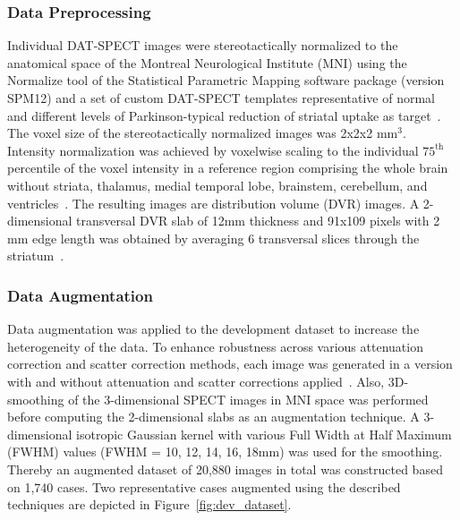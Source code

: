 \subsubsection{Data Preprocessing}
\label{subsubsec:img_preprocess_dev}



Individual DAT-SPECT images were stereotactically normalized to the anatomical space of the Montreal Neurological Institute (MNI) 
using the Normalize tool of the Statistical Parametric Mapping software package (version SPM12) and a set of custom DAT-SPECT templates 
representative of normal and different levels of Parkinson-typical reduction of striatal uptake as target~\citep{Apostolova2023-ec}.
The voxel size of the stereotactically normalized images was 2x2x2 mm$^{3}$. 
Intensity normalization was achieved by voxelwise scaling to the individual $75^{\text{th}}$ percentile of the voxel intensity in a reference region 
comprising the whole brain without striata, thalamus, medial temporal lobe, brainstem, cerebellum, and ventricles~\citep{Kupitz2014-ll}.
The resulting images are distribution volume (DVR) images. 
A 2-dimensional transversal DVR slab of 12mm thickness and 91x109 pixels with 2 mm edge length was obtained 
by averaging 6 transversal slices through the striatum~\citep{Buchert2006-pt}.

\subsubsection{Data Augmentation}
\label{subsec:augment}

Data augmentation was applied to the development dataset to increase the heterogeneity of the data.
To enhance robustness across various attenuation correction and scatter correction methods, 
each image was generated in a version with and without attenuation and scatter corrections applied~\citep{Schiebler2023}.
Also, 3D-smoothing of the 3-dimensional SPECT images in MNI space 
was performed before computing the 2-dimensional slabs as an augmentation technique.
A 3-dimensional isotropic Gaussian kernel with various Full Width at Half Maximum (FWHM) 
values (FWHM = 10, 12, 14, 16, 18mm) was used for the smoothing.
Thereby an augmented dataset of 20,880 images in total was constructed based on 1,740 cases.
Two representative cases augmented using the described techniques are depicted in Figure~\ref{fig:dev_dataset}.

